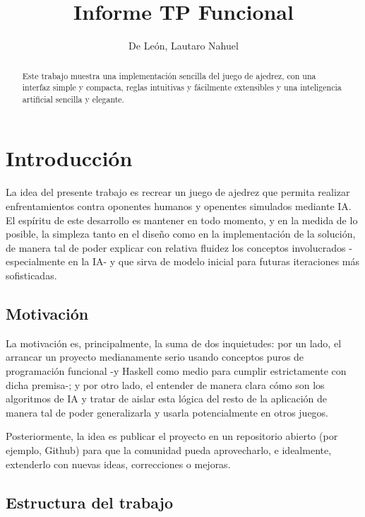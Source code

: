 \documentclass{llncs}
\begin{document}
%
\frontmatter
%
\pagestyle{headings}

\title{Informe TP Funcional}
%
%
\author{De León, Lautaro Nahuel}
%
%
\maketitle

\begin{abstract}
  Este trabajo muestra una implementación sencilla del juego de ajedrez, con una interfaz simple y compacta, reglas intuitivas y fácilmente extensibles y una inteligencia artificial sencilla y elegante.
\end{abstract}
%
\section{Introducción}
%

La idea del presente trabajo es recrear un juego de ajedrez que permita realizar enfrentamientos contra oponentes humanos y openentes simulados mediante IA. El espíritu de este desarrollo es mantener en todo momento, y en la medida de lo posible, la simpleza tanto en el diseño como en la implementación de la solución, de manera tal de poder explicar con relativa fluidez los conceptos involucrados -especialmente en la IA- y que sirva de modelo inicial para futuras iteraciones más sofisticadas.

\subsection{Motivación}
\label{subsec:Motivacion}

La motivación es, principalmente, la suma de dos inquietudes: por un lado, el arrancar un proyecto medianamente serio usando conceptos puros de programación funcional -y Haskell como medio para cumplir estrictamente con dicha premisa-; y por otro lado, el entender de manera clara cómo son los algoritmos de IA y tratar de aislar esta lógica del resto de la aplicación de manera tal de poder generalizarla y usarla potencialmente en otros juegos.

Posteriormente, la idea es publicar el proyecto en un repositorio abierto (por ejemplo, Github) para que la comunidad pueda aprovecharlo, e idealmente, extenderlo con nuevas ideas, correcciones o mejoras.

\subsection{Estructura del trabajo}
\label{subsec:Estructura trabajo}
\end{document}
